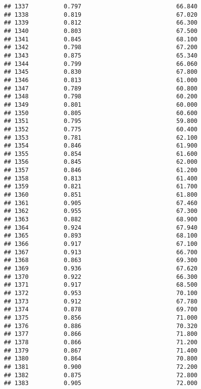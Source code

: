 \documentclass[
]{article}
\begin{document}
\begin{verbatim}
## 1337          0.797                           66.840
## 1338          0.819                           67.020
## 1339          0.812                           66.300
## 1340          0.803                           67.500
## 1341          0.845                           68.100
## 1342          0.798                           67.200
## 1343          0.875                           65.340
## 1344          0.799                           66.060
## 1345          0.830                           67.800
## 1346          0.813                           61.000
## 1347          0.789                           60.800
## 1348          0.798                           60.200
## 1349          0.801                           60.000
## 1350          0.805                           60.600
## 1351          0.795                           59.800
## 1352          0.775                           60.400
## 1353          0.781                           62.100
## 1354          0.846                           61.900
## 1355          0.854                           61.600
## 1356          0.845                           62.000
## 1357          0.846                           61.200
## 1358          0.813                           61.400
## 1359          0.821                           61.700
## 1360          0.851                           61.800
## 1361          0.905                           67.460
## 1362          0.955                           67.300
## 1363          0.882                           68.900
## 1364          0.924                           67.940
## 1365          0.893                           68.100
## 1366          0.917                           67.100
## 1367          0.913                           66.700
## 1368          0.863                           69.300
## 1369          0.936                           67.620
## 1370          0.922                           66.300
## 1371          0.917                           68.500
## 1372          0.953                           70.100
## 1373          0.912                           67.780
## 1374          0.878                           69.700
## 1375          0.856                           71.000
## 1376          0.886                           70.320
## 1377          0.866                           71.800
## 1378          0.866                           71.200
## 1379          0.867                           71.400
## 1380          0.864                           70.800
## 1381          0.900                           72.200
## 1382          0.875                           72.800
## 1383          0.905                           72.000

\end{verbatim}
\end{document}
